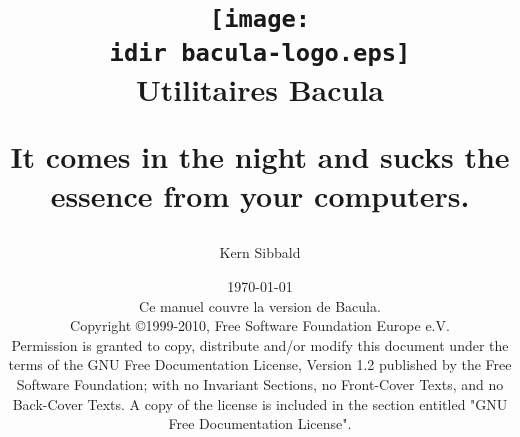 \documentclass[10pt,a4paper]{book}
\begin{document}
\sloppy

\parskip 10pt
\parindent 0pt

\title{\texttt{[image: \\idir bacula-logo.eps]} \\ \bigskip
  \Huge{Utilitaires Bacula}
  \begin{center}
   \large{It comes in the night and sucks 
          the essence from your computers. }
  \end{center}
}


\author{Kern Sibbald}
\date{\vspace{1.0in}\today \\
      Ce manuel couvre la version  de Bacula.\\
      \vspace{0.2in}
      Copyright \copyright 1999-2010, Free Software Foundation Europe
      e.V. \\
      \vspace{0.2in}
  Permission is granted to copy, distribute and/or modify this document under the terms of the
  GNU Free Documentation License, Version 1.2 published by the Free Software Foundation; 
  with no Invariant Sections, no Front-Cover Texts, and no Back-Cover Texts.
  A copy of the license is included in the section entitled "GNU Free Documentation License".
}

\maketitle

\clearpage
\tableofcontents
\clearpage








\listoffigures
\printindex[general]
\end{document}
